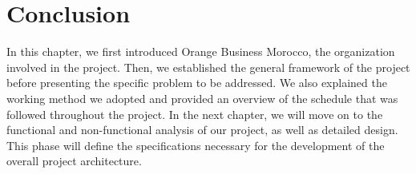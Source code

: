 \section{Conclusion}
In this chapter, we first introduced Orange Business Morocco, the organization involved in the project. Then, we established the general framework of the project before presenting the specific problem to be addressed. We also explained the working method we adopted and provided an overview of the schedule that was followed throughout the project. In the next chapter, we will move on to the functional and non-functional analysis of our project, as well as detailed design. This phase will define the specifications necessary for the development of the overall project architecture.
